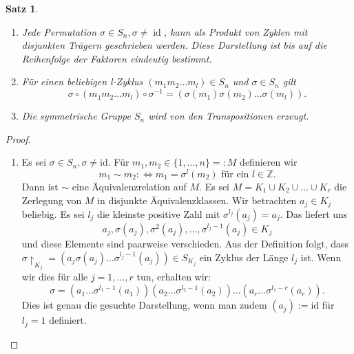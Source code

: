 \documentclass[12pt]{scrartcl} %
\DeclareMathOperator{\id}{id}
\newtheorem{thm}{Satz}
\theoremstyle{definition}
\theoremstyle{remark}
\begin{document}
\begin{thm}
\begin{enumerate}[label=(\alph*)]
	\item Jede Permutation $\sigma\in S_n, \sigma\neq \id$, kann als Produkt von Zyklen mit disjunkten Trägern geschrieben werden.
		Diese Darstellung ist bis auf die Reihenfolge der Faktoren eindeutig bestimmt.
	\item Für einen beliebigen l-Zyklus $(m_1m_2\dots m_l)\in S_n$ und $\sigma\in S_n$ gilt
		\[\sigma\circ(m_1m_2\dots m_l)\circ\sigma^{-1} = (\sigma(m_1)\sigma(m_2)\dots\sigma(m_l)).\]
	\item Die symmetrische Gruppe $S_n$ wird von den Transpositionen erzeugt.
\end{enumerate}
\end{thm}

\begin{proof}
	\begin{enumerate}[label=(\alph*)]
	\item Es sei $\sigma\in S_n, \sigma\neq\text{id}$. Für $m_1,m_2\in\{1,\dots,n\}=:M$ definieren wir 
		\[m_1\sim m_2 :\Leftrightarrow \text{\(m_1 = \sigma^l(m_2)\) für ein \(l\in\mathbb{Z}\)}.\]
		Dann ist $\sim$ eine Äquivalenzrelation auf $M$. Es sei $M = K_1\cup K_2\cup\dots\cup K_r$ die Zerlegung von $M$ in disjunkte Äquivalenzklassen.
		Wir betrachten $a_j\in K_j$ beliebig. Es sei $l_j$ die kleinste positive Zahl mit $\sigma^{l_j}(a_j) = a_j$. %
		Das liefert uns \[a_j,\sigma(a_j),\sigma^2(a_j),\dots,\sigma^{l_j-1}(a_j)\in K_j\] und diese Elemente sind paarweise verschieden.
		Aus der Definition folgt, dass $\sigma\upharpoonright_{K_j}=(a_j\sigma(a_j)\dots\sigma^{l_j-1}(a_j))\in S_{K_j}$ ein Zyklus der Länge $l_j$ ist.
		Wenn wir dies für alle $j=1,\dots,r$ tun, erhalten wir:
		\[\sigma = (a_1\dots\sigma^{l_1-1}(a_1))(a_2\dots\sigma^{l_2-1}(a_2))\dots(a_r\dots\sigma^{l_1-r}(a_r)).\]
		Dies ist genau die gesuchte Darstellung, wenn man zudem $(a_j):=\text{id}$ für $l_j = 1$ definiert.


\end{enumerate}
\end{proof}
\end{document}
